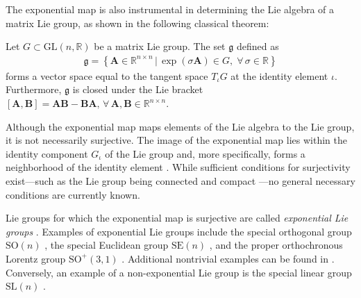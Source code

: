 The exponential map is also instrumental in determining the Lie algebra of a matrix Lie group, as shown in the following classical theorem:
\begin{theorem}
    Let $G\subset\text{GL}(n, \mathbb{R})$ be a matrix Lie group. The set $\mathfrak{g}$ defined as
    \begin{align}
        \mathfrak{g} = \left\{\mathbf{A}\in\mathbb{R}^{n\times n} \,|\, \exp(\sigma\mathbf{A})\in G,\;\forall\,\sigma\in\mathbb{R}\right\}
    \end{align}
    forms a vector space equal to the tangent space $T_\iota G$ at the identity element $\iota$. Furthermore, $\mathfrak{g}$ is closed under the Lie bracket $[\mathbf{A}, \mathbf{B}] = \mathbf{A}\mathbf{B} - \mathbf{B}\mathbf{A},\,\forall\,\mathbf{A},\mathbf{B}\in\mathbb{R}^{n\times n}$.\hfill\qedsymbol
\end{theorem}

Although the exponential map maps elements of the Lie algebra to the Lie group, it is not necessarily surjective. The image of the exponential map lies within the identity component $G_\iota$ of the Lie group and, more specifically, forms a neighborhood of the identity element \citep[p. 56]{Hall2015}. While sufficient conditions for surjectivity exist---such as the Lie group being connected and compact \citep[p. 316]{Hall2015}---no general necessary conditions are currently known.

Lie groups for which the exponential map is surjective are called \emph{exponential Lie groups} \citep{djokovic1995exponential}. Examples of exponential Lie groups include the special orthogonal group $\text{SO}(n)$ \citep[p. 28]{Gallier2020}, the special Euclidean  group $\text{SE}(n)$ \citep[p. 42]{Gallier2020}, and the proper orthochronous Lorentz group $\text{SO}^+(3,1)$ \citep[p. 197]{Gallier2020}. Additional nontrivial examples can be found in \citet{djokovic1995exponential}. Conversely, an example of a non-exponential Lie group is the special linear group $\text{SL}(n)$ \citep[p. 28]{Gallier2020}.
